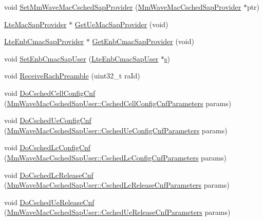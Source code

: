 \begin{DoxyCompactItemize}
void \hyperlink{classns3_1_1MmWaveEnbMac_a6b9b70f8a681a76a0965154d915c180c}{Set\+Mm\+Wave\+Mac\+Csched\+Sap\+Provider} (\hyperlink{classns3_1_1MmWaveMacCschedSapProvider}{Mm\+Wave\+Mac\+Csched\+Sap\+Provider} $\ast$ptr)
\item 
\hyperlink{classns3_1_1LteMacSapProvider}{Lte\+Mac\+Sap\+Provider} $\ast$ \hyperlink{classns3_1_1MmWaveEnbMac_a1dc44a05138597ff6ca75c7ba9c064ba}{Get\+Ue\+Mac\+Sap\+Provider} (void)
\item 
\hyperlink{classns3_1_1LteEnbCmacSapProvider}{Lte\+Enb\+Cmac\+Sap\+Provider} $\ast$ \hyperlink{classns3_1_1MmWaveEnbMac_ad49802e566d9f541ebce6489dec2813a}{Get\+Enb\+Cmac\+Sap\+Provider} (void)
\item 
void \hyperlink{classns3_1_1MmWaveEnbMac_aad86e77994f02b29738841edfa7a9361}{Set\+Enb\+Cmac\+Sap\+User} (\hyperlink{classns3_1_1LteEnbCmacSapUser}{Lte\+Enb\+Cmac\+Sap\+User} $\ast$\hyperlink{generate__test__data__lte__sinr_8m_ad83eeb3a142285d1243a08c6b7026df8}{s})
\item 
void \hyperlink{classns3_1_1MmWaveEnbMac_aaa785af7351c072325d0c1cb231586b9}{Receive\+Rach\+Preamble} (uint32\+\_\+t ra\+Id)
\item 
void \hyperlink{classns3_1_1MmWaveEnbMac_a777c7f5da9efcf1a63f5c75286b0ce86}{Do\+Csched\+Cell\+Config\+Cnf} (\hyperlink{structns3_1_1MmWaveMacCschedSapUser_1_1CschedCellConfigCnfParameters}{Mm\+Wave\+Mac\+Csched\+Sap\+User\+::\+Csched\+Cell\+Config\+Cnf\+Parameters} params)
\item 
void \hyperlink{classns3_1_1MmWaveEnbMac_abca5e0a09032a2f6188ceb450fa7a127}{Do\+Csched\+Ue\+Config\+Cnf} (\hyperlink{structns3_1_1MmWaveMacCschedSapUser_1_1CschedUeConfigCnfParameters}{Mm\+Wave\+Mac\+Csched\+Sap\+User\+::\+Csched\+Ue\+Config\+Cnf\+Parameters} params)
\item 
void \hyperlink{classns3_1_1MmWaveEnbMac_ab066ab9ec0c447666b312ac11597db77}{Do\+Csched\+Lc\+Config\+Cnf} (\hyperlink{structns3_1_1MmWaveMacCschedSapUser_1_1CschedLcConfigCnfParameters}{Mm\+Wave\+Mac\+Csched\+Sap\+User\+::\+Csched\+Lc\+Config\+Cnf\+Parameters} params)
\item 
void \hyperlink{classns3_1_1MmWaveEnbMac_a8617fa6804840948b856b2200e943e08}{Do\+Csched\+Lc\+Release\+Cnf} (\hyperlink{structns3_1_1MmWaveMacCschedSapUser_1_1CschedLcReleaseCnfParameters}{Mm\+Wave\+Mac\+Csched\+Sap\+User\+::\+Csched\+Lc\+Release\+Cnf\+Parameters} params)
\item 
void \hyperlink{classns3_1_1MmWaveEnbMac_abd53c17dabdeee18bf6ecc8f63a2c1d8}{Do\+Csched\+Ue\+Release\+Cnf} (\hyperlink{structns3_1_1MmWaveMacCschedSapUser_1_1CschedUeReleaseCnfParameters}{Mm\+Wave\+Mac\+Csched\+Sap\+User\+::\+Csched\+Ue\+Release\+Cnf\+Parameters} params)

\end{DoxyCompactItemize}
